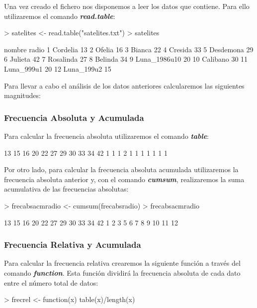 \documentclass [a4paper] {article}
\begin{document}
Una vez creado el fichero nos disponemos a leer los datos que contiene. Para ello utilizaremos el comando \textbf{\textit{read.table}}:
\begin{Schunk}
\begin{Sinput}
> satelites <- read.table("satelites.txt")
> satelites
\end{Sinput}
\begin{Soutput}
         nombre radio
1      Cordelia    13
2        Ofelia    16
3        Bianca    22
4       Cresida    33
5     Desdemona    29
6       Julieta    42
7     Rosalinda    27
8       Belinda    34
9  Luna_1986u10    20
10     Calibano    30
11   Luna_999u1    20
12   Luna_199u2    15
\end{Soutput}
\end{Schunk}

Para llevar a cabo el análisis de los datos anteriores calcularemos las siguientes magnitudes:
\subsubsection{Frecuencia Absoluta y Acumulada}
Para calcular la frecuencia absoluta utilizaremos el comando \textbf{\textit{table}}:
\begin{Schunk}
\begin{Soutput}
13 15 16 20 22 27 29 30 33 34 42 
 1  1  1  2  1  1  1  1  1  1  1 
\end{Soutput}
\end{Schunk}
\newpage
Por otro lado, para calcular la frecuencia absoluta acumulada utilizaremos la frecuencia absoluta anterior y, con el comando \textbf{\textit{cumsum}}, realizaremos la suma acumulativa de las frecuencias absolutas:
\begin{Schunk}
\begin{Sinput}
> frecabsacmradio <- cumsum(frecabsradio)
> frecabsacmradio
\end{Sinput}
\begin{Soutput}
13 15 16 20 22 27 29 30 33 34 42 
 1  2  3  5  6  7  8  9 10 11 12 
\end{Soutput}
\end{Schunk}

\subsubsection{Frecuencia Relativa y Acumulada}
Para calcular la frecuencia relativa crearemos la siguiente función a través del comando \textbf{\textit{function}}. Esta función dividirá la frecuencia absoluta de cada dato entre el número total de datos:
\begin{Schunk}
\begin{Sinput}
> frecrel <- function(x) {table(x)/length(x)}
\end{Sinput}
\end{Schunk}
\end{document}
